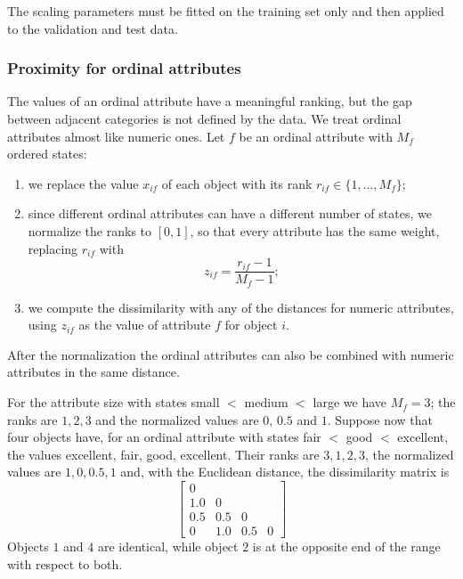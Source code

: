 \begin{remark}
The scaling parameters must be fitted on the training set only and then applied to the validation and test data.
\end{remark}

\subsubsection{Proximity for ordinal attributes}
The values of an ordinal attribute have a meaningful ranking, but the gap between adjacent categories is not defined by the data. We treat ordinal attributes almost like numeric ones. Let $f$ be an ordinal attribute with $M_f$ ordered states:
\begin{enumerate}
    \item we replace the value $x_{if}$ of each object with its rank $r_{if}\in\{1,\dots,M_f\}$;
    \item since different ordinal attributes can have a different number of states, we normalize the ranks to $[0,1]$, so that every attribute has the same weight, replacing $r_{if}$ with
    \[
        z_{if}=\frac{r_{if}-1}{M_f-1};
    \]
    \item we compute the dissimilarity with any of the distances for numeric attributes, using $z_{if}$ as the value of attribute $f$ for object $i$.
\end{enumerate}
After the normalization the ordinal attributes can also be combined with numeric attributes in the same distance.

\begin{example}
For the attribute size with states small $<$ medium $<$ large we have $M_f=3$; the ranks are $1,2,3$ and the normalized values are $0$, $0.5$ and $1$. Suppose now that four objects have, for an ordinal attribute with states fair $<$ good $<$ excellent, the values excellent, fair, good, excellent. Their ranks are $3,1,2,3$, the normalized values are $1,0,0.5,1$ and, with the Euclidean distance, the dissimilarity matrix is
\[
    \begin{bmatrix}
        0   &     &     &   \\
        1.0 & 0   &     &   \\
        0.5 & 0.5 & 0   &   \\
        0   & 1.0 & 0.5 & 0
    \end{bmatrix}
\]
Objects $1$ and $4$ are identical, while object $2$ is at the opposite end of the range with respect to both.
\end{example}

